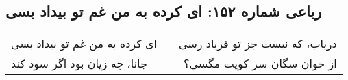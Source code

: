 \begin{center}
\section*{رباعی شماره ۱۵۲: ای کرده به من غم تو بیداد بسی}
\label{sec:152}
\begin{longtable}{l p{0.5cm} r}
ای کرده به من غم تو بیداد بسی
&&
دریاب، که نیست جز تو فریاد رسی
\\
جانا، چه زیان بود اگر سود کند
&&
از خوان سگان سر کویت مگسی؟
\\
\end{longtable}
\end{center}
